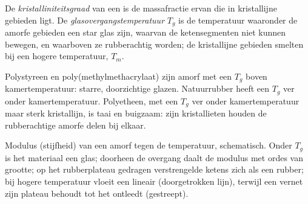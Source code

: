 \begin{definition}\label{def:b2:polymer-synthesis:transitions}
De \emph{kristalliniteitsgraad} van een  is de massafractie ervan
die in kristallijne gebieden ligt. De \emph{glasovergangstemperatuur}
$T_g$ is de temperatuur waaronder de amorfe gebieden een star glas zijn, waarvan de
ketensegmenten niet kunnen bewegen, en waarboven ze rubberachtig worden; de kristallijne gebieden smelten bij een hogere
temperatuur, $T_m$.
\end{definition}

Polystyreen en poly(methylmethacrylaat) zijn amorf met een $T_g$ boven kamertemperatuur: starre,
doorzichtige glazen. Natuurrubber heeft een $T_g$ ver onder kamertemperatuur. Polyetheen, met een $T_g$ ver
onder kamertemperatuur maar sterk kristallijn, is taai en buigzaam: zijn kristallieten houden de rubberachtige
amorfe delen bij elkaar.

\begin{omfigure}
\par\vspace{4pt}

{\small Modulus (stijfheid) van een amorf  tegen de temperatuur, schematisch. Onder $T_g$ is het
materiaal een glas; doorheen de overgang daalt de modulus met ordes van grootte; op het
rubberplateau gedragen verstrengelde ketens zich als een rubber; bij hogere temperatuur vloeit een lineair  (doorgetrokken
lijn), terwijl een vernet  zijn plateau behoudt tot het ontleedt (gestreept).}
\end{omfigure}

